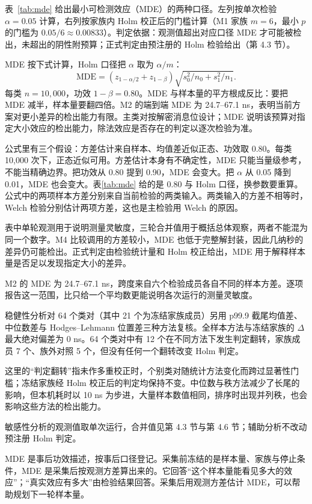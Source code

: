 表~\ref{tab:mde} 给出最小可检测效应（MDE）的两种口径。左列按单次检验 $\alpha=0.05$ 计算，右列按家族内 Holm 校正后的门槛计算（M1 家族 $m=6$，最小 $p$ 的门槛为 $0.05/6\approx0.00833$）。判定依据：观测值超出对应口径 MDE 才可能被检出，未超出的阴性附预算；正式判定由预注册的 Holm 检验给出（第 4.3 节）。

MDE 按下式计算，Holm 口径把 $\alpha$ 取为 $\alpha/m$：
\begin{equation}\tag{4.1}
\mathrm{MDE} = (z_{1-\alpha/2}+z_{1-\beta})\sqrt{s_0^2/n_0+s_1^2/n_1}.
\end{equation}
每类 $n=10{,}000$，功效 $1-\beta=0.80$。MDE 与样本量的平方根成反比：要把 MDE 减半，样本量要翻四倍。M2 的端到端 MDE 为 24.7--67.1 ns，表明当前方案对更小差异的检出能力有限。主类对按解密消息位设计；MDE 说明该预算对指定大小效应的检出能力，除法效应是否存在的判定以逐次检验为准。%

公式里有三个假设：方差估计来自样本、均值差近似正态、功效取 0.80。每类 10,000 次下，正态近似可用。方差估计本身有不确定性，MDE 只能当量级参考，不能当精确边界。把功效从 0.80 提到 0.90，MDE 会变大。把 $\alpha$ 从 0.05 降到 0.01，MDE 也会变大。表\ref{tab:mde} 给的是 0.80 与 Holm 口径，换参数要重算。公式中的两项样本方差分别来自当前检验的两类输入。两类输入的方差不相等时，Welch 检验分别估计两项方差，这也是主检验用 Welch 的原因。

表中单轮观测用于说明测量灵敏度，三轮合并值用于概括总体观察，两者不能混为同一个数字。M4 比较调用的方差较小，MDE 也低于完整解封装，因此几纳秒的差异仍可能检出。正式判定由检验统计量和 Holm 校正给出，MDE 用于解释样本量是否足以发现指定大小的差异。

M2 的 MDE 为 24.7--67.1 ns，跨度来自六个检验成员各自不同的样本方差。逐项报告这一范围，比只给一个平均数更能说明各次运行的测量灵敏度。

稳健性分析对 64 个类对（其中 21 个为冻结家族成员）另用 p99.9 截尾均值差、中位数差与 Hodges--Lehmann 位置差三种方法复核。全样本方法与冻结家族的 $\Delta$ 最大绝对偏差为 0 ns。64 个类对中有 12 个在不同方法下发生判定翻转，家族成员 7 个、族外对照 5 个，但没有任何一个翻转改变 Holm 判定。%

这里的“判定翻转”指未作多重校正时，个别类对随统计方法变化而跨过显著性门槛；冻结家族经 Holm 校正后的判定均保持不变。中位数与秩方法减少了长尾的影响，但本机耗时以 10 ns 为步进，大量样本数值相同，排序时出现并列秩，也会影响这些方法的检出能力。


敏感性分析的观测值取单次运行，合并值见第 4.3 节与第 4.6 节；辅助分析不改动预注册 Holm 判定。

MDE 是事后功效描述，按事后口径登记。采集前冻结的是样本量、家族与停止条件，MDE 是采集后按观测方差算出来的。它回答“这个样本量能看见多大的效应”；“真实效应有多大”由检验结果回答。采集后用观测方差估计 MDE，可以帮助规划下一轮样本量。

